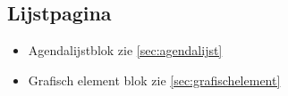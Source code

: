 \subsection{Lijstpagina}
\label{sec:lijstpagina}

\begin{itemize}
  \item Agendalijstblok zie \ref{sec:agendalijst}
  \item Grafisch element blok zie \ref{sec:grafischelement}
\end{itemize}